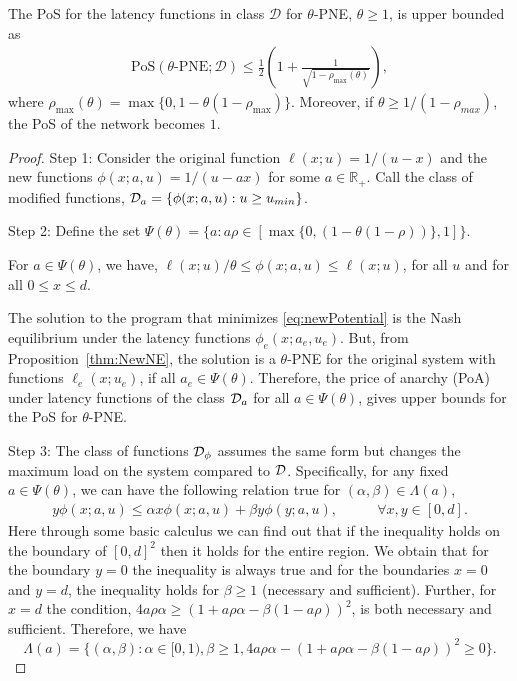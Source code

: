 \begin{lemma}
The PoS for the latency functions in class $\mathcal{D}$ for $\theta$-PNE,  $\theta \geq  1$, is upper bounded as
\begin{align*}
 \text{PoS}(\theta\text{-PNE};\mathcal{D})\leq \frac{1}{2}\left( 1+ \frac{1}{\sqrt{1- \rho_{\max}(\theta)}}\right),
\end{align*}
where $\rho_{\max}(\theta) = \max \{0, 1-\theta(1-\rho_{\max})\}$. Moreover, if $\theta \geq 1/(1-\rho_{max})$, the PoS of the network becomes $1$. 
\label{lemm:MM1}
\end{lemma}
\begin{proof}
Step 1: Consider the original function $\ell(x;u) = 1/(u-x)$ and the new functions $\phi(x;a,u) = 1/(u-ax)$ for some $a\in \mathbb{R}_{+}$.  Call the class of modified functions, $\mathcal{D}_{a} = \{\phi(x;a,u): u \geq u_{min}\}$.  

Step 2: Define the set $\Psi(\theta)= \{a:  a\rho\in [\max\{0,(1-\theta(1-\rho))\}, 1 ]\}.$ 

For $a\in \Psi(\theta)$, we have, $ \ell(x;u)/\theta \leq \phi(x;a,u)\leq \ell(x;u) $, for all $u$ and for all  $0\leq x\leq d$. 

The solution to the program that minimizes \eqref{eq:newPotential} is the Nash equilibrium under the latency functions $\phi_e(x;a_e,u_e)$. But, from Proposition~\ref{thm:NewNE}, the solution is a $\theta$-PNE for the original system with functions $\ell_e(x;u_e)$, if all $a_e\in \Psi(\theta)$. Therefore, the price of anarchy (PoA) under latency functions of the class $\mathcal{D}_{a}$ for all $a\in \Psi(\theta)$, gives upper bounds for the PoS for $\theta$-PNE. 

Step 3: 
The class of functions $\mathcal{D}_{\phi}$ assumes the same form but changes the maximum load on the system compared to $\mathcal{D}$. Specifically, for any fixed $a\in  \Psi(\theta) $, we can have the following relation true for $(\alpha,\beta)\in \Lambda(a)$,
\begin{align*}
y\phi(x; a, u) \le \alpha x\phi(x; a,u) + \beta y\phi(y; a, u),& \qquad \forall x,y \in [0,d].
\end{align*} 
Here through some basic calculus we can find out that if the inequality holds on the boundary of $[0,d]^2$ then it holds for the entire region. We obtain that for the boundary $y=0$ the inequality  is always true and for the boundaries $x = 0$ and  $y = d$, the  inequality holds for $\beta \geq 1$ (necessary and sufficient). Further, for $x=d$ the condition,  $4a\rho \alpha  \geq(1+a\rho\alpha -  \beta(1-a\rho))^2$, is  both necessary and sufficient. Therefore, we have $$\Lambda(a) = \{(\alpha,\beta): \alpha\in[0,1),  \beta\geq 1,  4a\rho \alpha  - (1+a\rho\alpha - \beta(1-a\rho))^2\geq 0 \}.$$


\end{proof}
